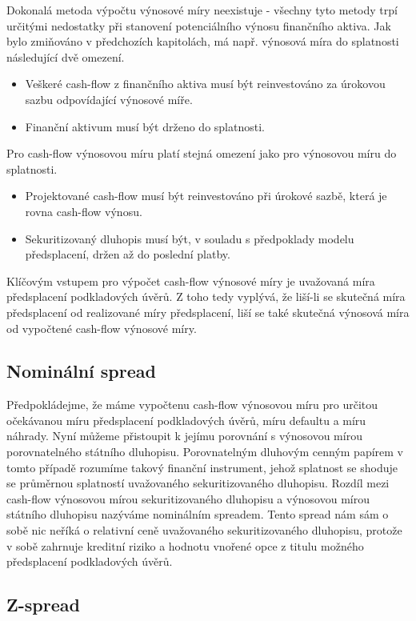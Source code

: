 \documentclass[a4paper]{book}
\begin{document}
Dokonalá metoda výpočtu výnosové míry neexistuje - všechny tyto metody trpí určitými nedostatky při stanovení potenciálního výnosu finančního aktiva. Jak bylo zmiňováno v předchozích kapitolách, má např. výnosová míra do splatnosti následující dvě omezení.
\begin{itemize}
\item Veškeré cash-flow z finančního aktiva musí být reinvestováno za úrokovou sazbu odpovídající výnosové míře.
\item Finanční aktivum musí být drženo do splatnosti.
\end{itemize}
Pro cash-flow výnosovou míru platí stejná omezení jako pro výnosovou míru do splatnosti.
\begin{itemize}
\item Projektované cash-flow musí být reinvestováno při úrokové sazbě, která je rovna cash-flow výnosu.
\item Sekuritizovaný dluhopis musí být, v souladu s předpoklady modelu předsplacení, držen až do poslední platby.
\end{itemize}
Klíčovým vstupem pro výpočet cash-flow výnosové míry je uvažovaná míra předsplacení podkladových úvěrů. Z toho tedy vyplývá, že liší-li se skutečná míra předsplacení od realizované míry předsplacení, liší se také skutečná výnosová míra od vypočtené cash-flow výnosové míry.

\subsection{Nominální spread}

Předpokládejme, že máme vypočtenu cash-flow výnosovou míru pro určitou očekávanou míru předsplacení podkladových úvěrů, míru defaultu a míru náhrady. Nyní můžeme přistoupit k jejímu porovnání s výnosovou mírou porovnatelného státního dluhopisu. Porovnatelným dluhovým cenným papírem v tomto případě rozumíme takový finanční instrument, jehož splatnost se shoduje se průměrnou splatností uvažovaného sekuritizovaného dluhopisu. Rozdíl mezi cash-flow výnosovou mírou sekuritizovaného dluhopisu a výnosovou mírou státního dluhopisu nazýváme nominálním spreadem. Tento spread nám sám o sobě nic neříká o relativní ceně uvažovaného sekuritizovaného dluhopisu, protože v sobě zahrnuje kreditní riziko a hodnotu vnořené opce z titulu možného předsplacení podkladových úvěrů.

\subsection{Z-spread}
\end{document}
